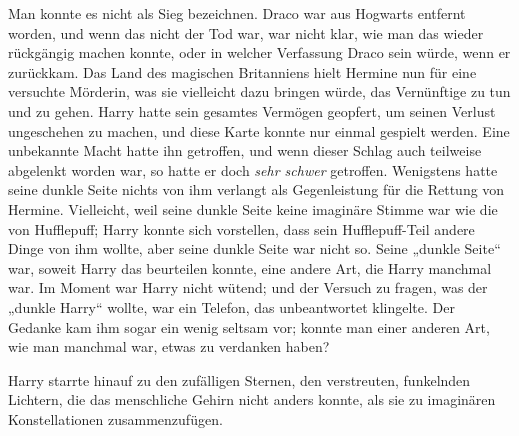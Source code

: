 Man konnte es nicht als Sieg bezeichnen. Draco war aus Hogwarts entfernt worden, und wenn das nicht der Tod war, war nicht klar, wie man das wieder rückgängig machen konnte, oder in welcher Verfassung Draco sein würde, wenn er zurückkam. Das Land des magischen Britanniens hielt Hermine nun für eine versuchte Mörderin, was sie vielleicht dazu bringen würde, das Vernünftige zu tun und zu gehen. Harry hatte sein gesamtes Vermögen geopfert, um seinen Verlust ungeschehen zu machen, und diese Karte konnte nur einmal gespielt werden.
Eine unbekannte Macht hatte ihn getroffen, und wenn dieser Schlag auch teilweise abgelenkt worden war, so hatte er doch \emph{sehr schwer} getroffen.
Wenigstens hatte seine dunkle Seite nichts von ihm verlangt als Gegenleistung für die Rettung von Hermine. Vielleicht, weil seine dunkle Seite keine imaginäre Stimme war wie die von Hufflepuff; Harry konnte sich vorstellen, dass sein Hufflepuff-Teil andere Dinge von ihm wollte, aber seine dunkle Seite war nicht so. Seine „dunkle Seite“ war, soweit Harry das beurteilen konnte, eine andere Art, die Harry manchmal war. Im Moment war Harry nicht wütend; und der Versuch zu fragen, was der „dunkle Harry“ wollte, war ein Telefon, das unbeantwortet klingelte. Der Gedanke kam ihm sogar ein wenig seltsam vor; konnte man einer anderen Art, wie man manchmal war, etwas zu verdanken haben?

Harry starrte hinauf zu den zufälligen Sternen, den verstreuten, funkelnden Lichtern, die das menschliche Gehirn nicht anders konnte, als sie zu imaginären Konstellationen zusammenzufügen.

